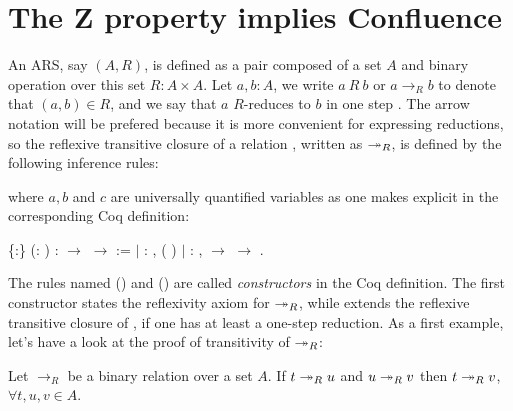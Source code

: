 \section{The Z property implies Confluence}




  An ARS, say $(A,R)$, is defined as a pair composed of a set $A$ and
  binary operation over this set $R:A\times A$. Let $a,b: A$, we write
  $a\ R\ b$ or $a\to_R b$ to denote that $(a,b)\in R$, and we say that
  $a$ $R$-reduces to $b$ in one step . The arrow notation will be
  prefered because it is more convenient for expressing reductions, so
  the reflexive transitive closure of a relation , written as
  $\twoheadrightarrow_R$, is defined by the following inference rules:
   \noindent where $a,b$ and $c$ are universally
  quantified variables as one makes explicit in the corresponding Coq
  definition: \begin{coqdoccode}
\coqdocemptyline
\coqdocnoindent
{}  \{:\} (:  ) :  \ensuremath{\rightarrow}  \ensuremath{\rightarrow}  :=\coqdoceol
\coqdocnoindent
\ensuremath{|} : \coqdockw{\ensuremath{\forall}} , ( )  \coqdoceol
\coqdocnoindent
\ensuremath{|} : \coqdockw{\ensuremath{\forall}}   ,    \ensuremath{\rightarrow}     \ensuremath{\rightarrow}    .\coqdoceol
\coqdocemptyline
\end{coqdoccode}
The rules named () and () are called \textit{constructors}
in the Coq definition. The first constructor states the reflexivity
axiom for $\twoheadrightarrow_R$, while  extends the reflexive transitive
closure of , if one has at least a one-step reduction. As a first
example, let's have a look at the proof of transitivity of $\twoheadrightarrow_R$:


\begin{lemma} Let $\to_R$ be a binary relation over a set $A$. If $t
\twoheadrightarrow_R u$ and $u \twoheadrightarrow_R v$ then $t \twoheadrightarrow_R v$, $\forall t,u,v \in A$.
\end{lemma}


